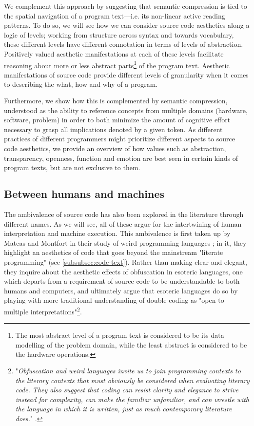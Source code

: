 We complement this approach by suggesting that semantic compression is tied to the spatial navigation of a program text—i.e. its non-linear active reading patterns. To do so, we will see how we can consider source code aesthetics along a logic of levels; working from structure across syntax and towards vocabulary, these different levels have different connotation in terms of levels of abstraction. Positively valued aesthetic manifestations at each of these levels facilitate reasoning about more or less abstract parts\footnote{The most abstract level of a program text is considered to be its data modelling of the problem domain, while the least abstract is considered to be the hardware operations.} of the program text. Aesthetic manifestations of source code provide different levels of granularity when it comes to describing the what, how and why of a program.

Furthermore, we show how this is complemented by semantic compression, understood as the ability to reference concepts from multiple domains (hardware, software, problem) in order to both minimize the amount of cognitive effort necessary to grasp all implications denoted by a given token. As different practices of different programmers might prioritize different aspects to source code aesthetics, we provide an overview of how values such as abstraction, transparency, openness, function and emotion are best seen in certain kinds of program texts, but are not exclusive to them.

\subsection{Between humans and machines}
\label{subsec:humans-machines}

The ambivalence of source code has also been explored in the literature through different names. As we will see, all of these argue for the intertwining of human interpretation and machine execution. This ambivalence is first taken up by Mateas and Montfort in their study of weird programming languages \citep{mateas_box_2005}; in it, they highlight an aesthetics of code that goes beyond the mainstream "literate programming" (see \ref{subsubsec:code-text}). Rather than making clear and elegant, they inquire about the aesthetic effects of obfuscation in esoteric languages, one which departs from a requirement of source code to be understandable to both humans and computers, and ultimately argue that esoteric languages do so by playing with more traditional understanding of double-coding as "open to multiple interpretations"\footnote{"\emph{Obfuscation and weird languages invite us to join programming contexts to the literary contexts that must obviously be considered when evaluating literary code. They also suggest that coding can resist clarity and elegance to strive instead for complexity, can make the familiar unfamiliar, and can wrestle with the language in which it is written, just as much contemporary literature does.}" \citep{mateas_box_2005}.}.

